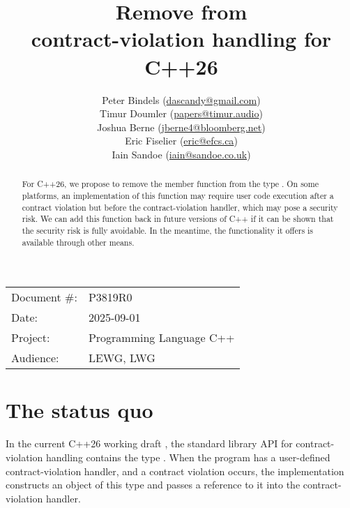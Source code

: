 

 \usepackage[bottom]{footmisc} 



\title{Remove  from \\ contract-violation handling for C++26}
\author{
  Peter Bindels \small(\href{mailto:dascandy@gmail.com}{dascandy@gmail.com}) \\
  Timur Doumler \small(\href{mailto:papers@timur.audio}{papers@timur.audio}) \\
  Joshua Berne \small(\href{mailto:jberne4@bloomberg.net}{jberne4@bloomberg.net}) \\ 
  Eric Fiselier \small(\href{mailto:eric@efcs.ca}{eric@efcs.ca}) \\
  Iain Sandoe \small(\href{mailto:iain@sandoe.co.uk}{iain@sandoe.co.uk})
}
\date{}
\maketitle

\begin{tabular}{ll}
Document \#: & P3819R0 \\
Date: &2025-09-01 \\
Project: & Programming Language C++ \\
Audience: & LEWG, LWG
\end{tabular}

\begin{abstract}
For C++26, we propose to remove the member function  from the type . On some platforms, an implementation of this function may require user code execution after a contract violation but before the contract-violation handler, which may pose a security risk. We can add this function back in future versions of C++ if it can be shown that the security risk is fully avoidable. In the meantime, the functionality it offers is available through other means.
\end{abstract}


\section{The status quo}

In the current C++26 working draft \cite{N5014}, the standard library API for contract-violation handling contains the type . When the program has a user-defined contract-violation handler, and a contract violation occurs, the implementation constructs an object of this type and passes a reference to it into the contract-violation handler.

